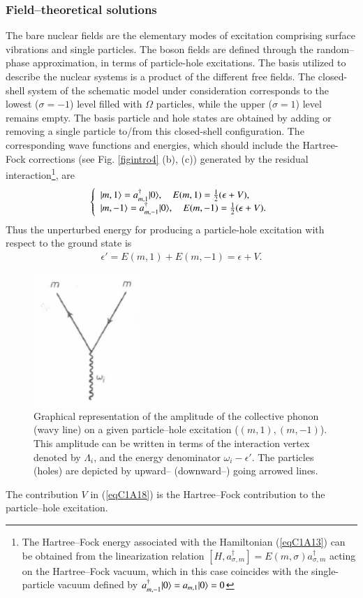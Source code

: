 \subsubsection{Field--theoretical solutions}
 The bare nuclear  fields are
the elementary modes of excitation comprising surface vibrations and single
particles. The boson fields are defined through the random--phase
approximation, in terms of particle-hole excitations. The basis utilized to
describe the nuclear systems is a product of the different free fields. 
The closed-shell system of the schematic model under consideration corresponds to the lowest ($\sigma = - 1$) level filled with $\Omega$ particles, while the upper
($\sigma =  1$) level remains empty. The basis particle and hole states are obtained
by adding or removing a single particle to/from this closed-shell configuration.
The corresponding wave functions and energies, which should include the
Hartree-Fock corrections (see Fig. \ref{figintro4} (b), (c)) generated by the residual interaction\footnote{The Hartree--Fock energy associated with the Hamiltonian (\ref{eqC1A13}) can be obtained
from the linearization relation $[H,a_{\sigma,m}^\dagger]=E(m,\sigma)a^\dagger_{\sigma,m}$ acting on the Hartree--Fock
vacuum, which in this case coincides with the single-particle vacuum defined by
 $a^\dagger_{m,-1}|{0} \rangle=a_{m,1}|{0} \rangle=0$}, are
 \begin{align}\label{eqC1A17} 
\left\{\begin{array}{l}
 |{m,1} \rangle=a^\dagger_{m,1}|{0} \rangle,\quad E(m,1)=\frac{1}{2}(\epsilon+V),\\ 
|{m,-1} \rangle=a^\dagger_{m,-1}|{0} \rangle,\quad E(m,-1)=\frac{1}{2}(\epsilon+V).
\end{array} \right.
 \end{align}
Thus the unperturbed energy for producing a particle-hole excitation with
respect to the ground state is
 \begin{align}\label{eqC1A18} 
\epsilon'=E(m,1)+E(m,-1)=\epsilon+V.
 \end{align}
 \begin{figure}
 \centerline {
 \includegraphics*[width=4cm]{introduccion/figs/fig18}
 }
 \caption{Graphical representation of the amplitude of the collective phonon (wavy line) on a given particle--hole excitation ($(m,1),(m,-1)$). This amplitude can be written in terms of the interaction vertex denoted by $\Lambda_i$, and the energy denominator $\omega_i-\epsilon'$. The particles (holes) are depicted by upward-- (downward--) going arrowed lines.}
 \label{figC1A1}
 \end{figure}
The contribution $V$ in (\ref{eqC1A18}) is the Hartree--Fock contribution to the particle--hole excitation.

